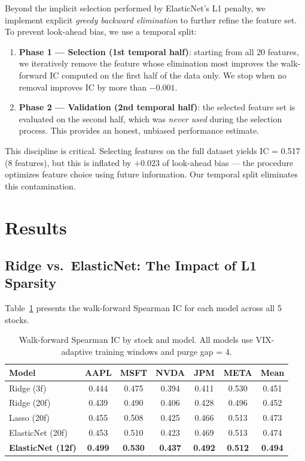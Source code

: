 \documentclass[11pt,a4paper]{article}
\begin{document}
Beyond the implicit selection performed by ElasticNet's L1 penalty, we implement explicit \textit{greedy backward elimination} to further refine the feature set. To prevent look-ahead bias, we use a temporal split:

\begin{enumerate}
    \item \textbf{Phase 1 --- Selection (1st temporal half)}: starting from all 20 features, we iteratively remove the feature whose elimination most improves the walk-forward IC computed on the first half of the data only. We stop when no removal improves IC by more than $-0.001$.

    \item \textbf{Phase 2 --- Validation (2nd temporal half)}: the selected feature set is evaluated on the second half, which was \textit{never used} during the selection process. This provides an honest, unbiased performance estimate.
\end{enumerate}

This discipline is critical. Selecting features on the full dataset yields IC = 0.517 (8 features), but this is inflated by $+0.023$ of look-ahead bias --- the procedure optimizes feature choice using future information. Our temporal split eliminates this contamination.

\section{Results}
\label{sec:results}

\subsection{Ridge vs.\ ElasticNet: The Impact of L1 Sparsity}

Table~\ref{tab:main_results} presents the walk-forward Spearman IC for each model across all 5 stocks.

\begin{table}[H]
\centering
\caption{Walk-forward Spearman IC by stock and model. All models use VIX-adaptive training windows and purge gap = 4.}
\label{tab:main_results}
\begin{tabular}{l c c c c c c}
\toprule
\textbf{Model} & \textbf{AAPL} & \textbf{MSFT} & \textbf{NVDA} & \textbf{JPM} & \textbf{META} & \textbf{Mean} \\
\midrule
Ridge (3f)         & 0.444 & 0.475 & 0.394 & 0.411 & 0.530 & 0.451 \\
Ridge (20f)        & 0.439 & 0.490 & 0.406 & 0.428 & 0.496 & 0.452 \\
Lasso (20f)        & 0.455 & 0.508 & 0.425 & 0.466 & 0.513 & 0.473 \\
ElasticNet (20f)   & 0.453 & 0.510 & 0.423 & 0.469 & 0.513 & 0.474 \\
\textbf{ElasticNet (12f)} & \textbf{0.499} & \textbf{0.530} & \textbf{0.437} & \textbf{0.492} & \textbf{0.512} & \textbf{0.494} \\
\bottomrule
\end{tabular}
\end{table}
\end{document}
